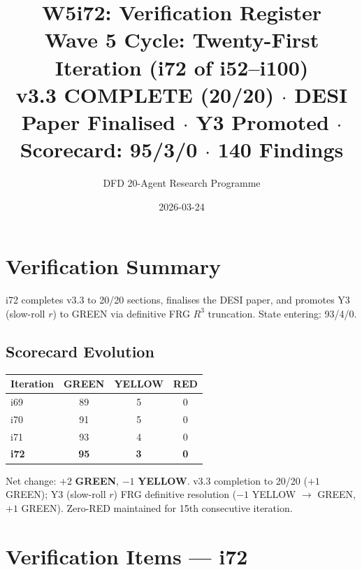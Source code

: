 \documentclass[11pt,a4paper]{article}
\title{\Large W5i72: Verification Register\\[6pt]
\normalsize Wave 5 Cycle: Twenty-First Iteration (i72 of i52--i100)\\[6pt]
v3.3 COMPLETE (20/20) $\cdot$ DESI Paper Finalised $\cdot$ Y3 Promoted $\cdot$ Scorecard: 95/3/0 $\cdot$ 140 Findings}
\author{DFD 20-Agent Research Programme}
\date{2026-03-24}
\newcommand{\GREEN}{\textcolor{dfdgreen}{\textbf{GREEN}}}
\newcommand{\YELLOW}{\textcolor{dfdyellow}{\textbf{YELLOW}}}
\begin{document}
\maketitle

\section{Verification Summary}

i72 completes v3.3 to 20/20 sections, finalises the DESI paper, and promotes Y3 (slow-roll $r$) to GREEN via definitive FRG $R^3$ truncation. State entering: 93/4/0.

\subsection{Scorecard Evolution}

\begin{center}
\begin{tabular}{lccc}
\toprule
\textbf{Iteration} & \textbf{GREEN} & \textbf{YELLOW} & \textbf{RED} \\
\midrule
i69 & 89 & 5 & 0 \\
i70 & 91 & 5 & 0 \\
i71 & 93 & 4 & 0 \\
\textbf{i72} & \textbf{95} & \textbf{3} & \textbf{0} \\
\bottomrule
\end{tabular}
\end{center}

Net change: $+2$ \GREEN, $-1$ \YELLOW. v3.3 completion to 20/20 ($+1$ GREEN); Y3 (slow-roll $r$) FRG definitive resolution ($-1$ YELLOW $\to$ GREEN, $+1$ GREEN). Zero-RED maintained for 15th consecutive iteration.

\section{Verification Items --- i72}
\end{document}
